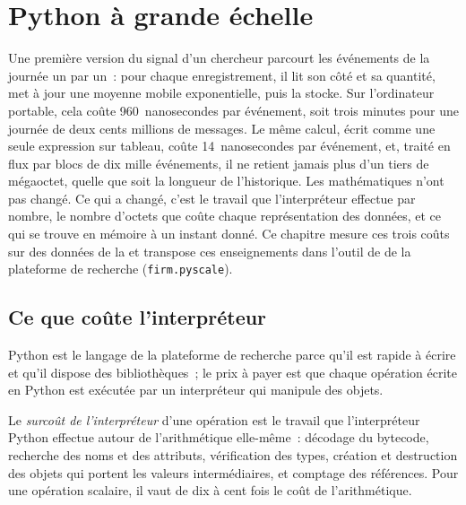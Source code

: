 \chapter{Python à grande échelle}\label{ch:pl:python-at-scale}

Une première version du signal d'un chercheur parcourt les événements de la journée un par un~: pour chaque enregistrement, il lit son côté et sa quantité,
met à jour une moyenne mobile exponentielle, puis la stocke. Sur l'ordinateur portable, cela coûte 960~nanosecondes par événement, soit trois minutes pour une journée de
deux cents millions de messages. Le même calcul, écrit comme une seule expression sur tableau, coûte 14~nanosecondes par événement, et, traité
en flux par blocs de dix mille événements, il ne retient jamais plus d'un tiers de mégaoctet, quelle que soit la longueur de
l'historique. Les mathématiques n'ont pas changé. Ce qui a changé, c'est le travail que l'interpréteur effectue par nombre, le nombre d'octets
que coûte chaque représentation des données, et ce qui se trouve en mémoire à un instant donné. Ce chapitre mesure ces trois coûts sur des données de la
 et transpose ces enseignements dans l'outil de  de la plateforme de recherche (\texttt{firm.pyscale}).

\section{Ce que coûte l'interpréteur}

Python est le langage de la plateforme de recherche parce qu'il est rapide à écrire et qu'il dispose des bibliothèques~; le prix à payer est que chaque
opération écrite en Python est exécutée par un interpréteur qui manipule des objets.

\begin{definition}\label{def:pl:python-at-scale:overhead}
Le \emph{surcoût de l'interpréteur} d'une opération est le travail que l'interpréteur Python effectue autour de l'arithmétique
elle-même~: décodage du bytecode, recherche des noms et des attributs, vérification des types, création et destruction des objets
qui portent les valeurs intermédiaires, et comptage des références. Pour une opération scalaire, il vaut de dix à cent fois le coût
de l'arithmétique.
\end{definition}

